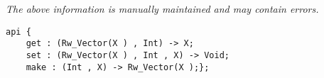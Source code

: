 \label{api:Unsafe\_Rw\_Vector}

{\tiny \it The above information is manually maintained and may contain errors.}
\begin{verbatim}
api {
    get : (Rw_Vector(X ) , Int) -> X;
    set : (Rw_Vector(X ) , Int , X) -> Void;
    make : (Int , X) -> Rw_Vector(X );};
\end{verbatim}
